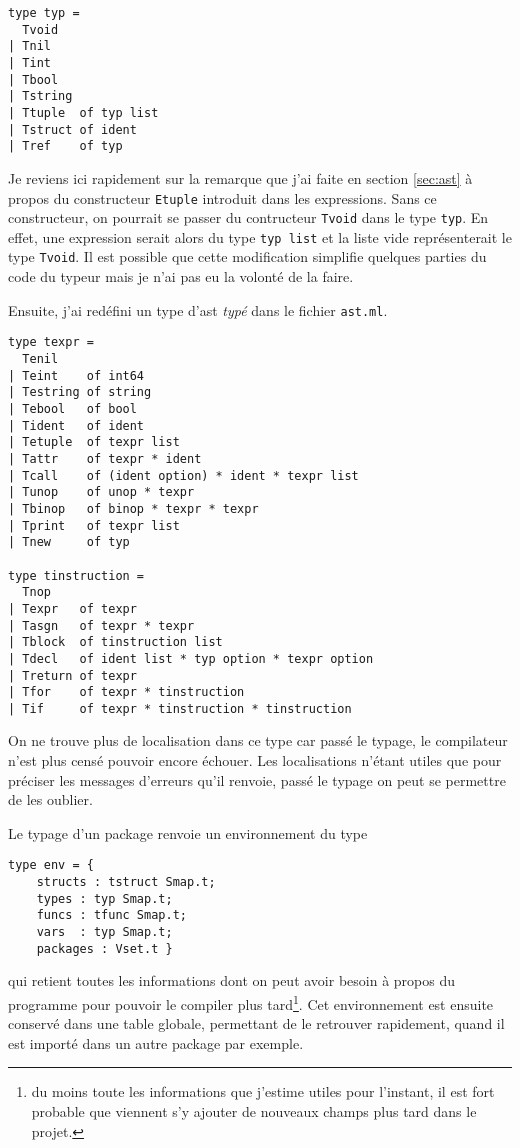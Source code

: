 \documentclass{article}
\begin{document}
\begin{verbatim}
type typ =
  Tvoid
| Tnil
| Tint
| Tbool
| Tstring
| Ttuple  of typ list
| Tstruct of ident
| Tref    of typ
\end{verbatim}

Je reviens ici rapidement sur la remarque que j'ai faite en section \ref{sec:ast} à propos du constructeur \texttt{Etuple} introduit dans les expressions. Sans ce constructeur, on pourrait se passer du contructeur \texttt{Tvoid} dans le type \texttt{typ}. En effet, une expression serait alors du type \texttt{typ list} et la liste vide représenterait le type \texttt{Tvoid}. Il est possible que cette modification simplifie quelques parties du code du typeur mais je n'ai pas eu la volonté de la faire.

Ensuite, j'ai redéfini un type d'ast \textit{typé} dans le fichier \texttt{ast.ml}.

\begin{verbatim}
type texpr =
  Tenil
| Teint    of int64
| Testring of string
| Tebool   of bool
| Tident   of ident
| Tetuple  of texpr list
| Tattr    of texpr * ident
| Tcall    of (ident option) * ident * texpr list
| Tunop    of unop * texpr
| Tbinop   of binop * texpr * texpr
| Tprint   of texpr list
| Tnew     of typ

type tinstruction =
  Tnop
| Texpr   of texpr
| Tasgn   of texpr * texpr
| Tblock  of tinstruction list
| Tdecl   of ident list * typ option * texpr option
| Treturn of texpr
| Tfor    of texpr * tinstruction
| Tif     of texpr * tinstruction * tinstruction
\end{verbatim}

On ne trouve plus de localisation dans ce type car passé le typage, le compilateur n'est plus censé pouvoir encore échouer. Les localisations n'étant utiles que pour préciser les messages d'erreurs qu'il renvoie, passé le typage on peut se permettre de les oublier.

Le typage d'un package renvoie un environnement du type

\begin{verbatim}
type env = {
    structs : tstruct Smap.t;
    types : typ Smap.t;
    funcs : tfunc Smap.t;
    vars  : typ Smap.t;
    packages : Vset.t }
\end{verbatim}

qui retient toutes les informations dont on peut avoir besoin à propos du programme pour pouvoir le compiler plus tard\footnote{du moins toute les informations que j'estime utiles pour l'instant, il est fort probable que viennent s'y ajouter de nouveaux champs plus tard dans le projet.}. Cet environnement est ensuite conservé dans une table globale, permettant de le retrouver rapidement, quand il est importé dans un autre package par exemple.
\end{document}
